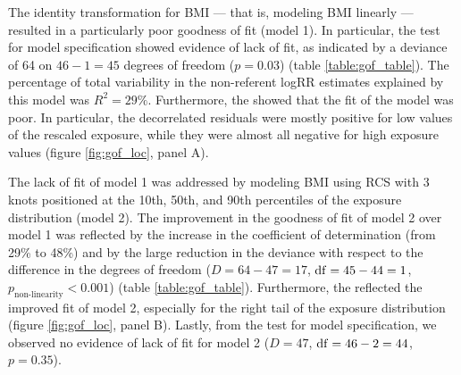 The identity transformation for BMI --- that is, modeling BMI linearly --- resulted in a particularly poor goodness of fit (model 1). In particular, the test for model specification showed evidence of lack of fit, as indicated by a deviance of 64 on $46-1=45$ degrees of freedom ($p=0.03$) (table \ref{table:gof_table}). The percentage of total variability in the non-referent logRR estimates explained by this model was $R^2=29\%$. Furthermore, the \rveplot{} showed that the fit of the model was poor. In particular, the decorrelated residuals were mostly positive for low values of the rescaled exposure, while they were almost all negative for high exposure values (figure \ref{fig:gof_loc}, panel A). 

The lack of fit of model 1 was addressed by modeling BMI using RCS with 3 knots positioned at the 10th, 50th, and 90th percentiles of the exposure distribution (model 2). The improvement in the goodness of fit of model 2 over model 1 was reflected by the increase in the coefficient of determination (from 29\% to 48\%) and by the large reduction in the deviance with respect to the difference in the degrees of freedom ($D=64-47=17$, $\operatorname{df}=45-44=1$, $p_{\textrm{non-linearity}}<0.001$) (table \ref{table:gof_table}). Furthermore, the \rveplot{} reflected the improved fit of model 2, especially for the right tail of the exposure distribution (figure \ref{fig:gof_loc}, panel B). Lastly, from the test for model specification, we observed no evidence of lack of fit for model 2 ($D=47$, $\operatorname{df}=46-2=44$, $p=0.35$).

